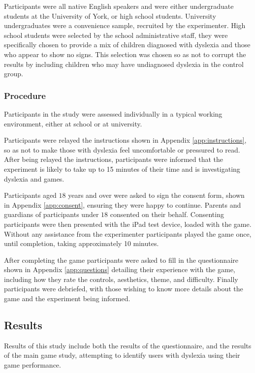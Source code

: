 \documentclass[journal]{IEEEtran}
\begin{document}
Participants were all native English speakers and were either undergraduate students at the University of York, or high school students. University undergraduates were a convenience sample, recruited by the experimenter.
High school students were selected by the school administrative staff, they were specifically chosen to provide a mix of children diagnosed with dyslexia and those who appear to show no signs. This selection was chosen so as not to corrupt the results by including children who may have undiagnosed dyslexia in the control group.

\subsubsection{Procedure}
Participants in the study were assessed individually in a typical working environment, either at school or at university. 

Participants were relayed the instructions shown in Appendix \ref{app:instructions}, so as not to make those with dyslexia feel uncomfortable or pressured to read. 
After being relayed the instructions, participants were informed that the experiment is likely to take up to 15 minutes of their time and is investigating dyslexia and games. 

Participants aged $18$ years and over were asked to sign the consent form, shown in Appendix \ref{app:consent}, ensuring they were happy to continue. Parents and guardians of participants under $18$ consented on their behalf. 
Consenting participants were then presented with the iPad test device, loaded with the game. Without any assistance from the experimenter participants played the game once, until completion, taking approximately 10 minutes. 

After completing the game participants were asked to fill in the questionnaire shown in Appendix \ref{app:questions} detailing their experience with the game, including how they rate the controls, aesthetics, theme, and difficulty.
Finally participants were debriefed, with those wishing to know more details about the game and the experiment being informed.

\subsection{Results}
Results of this study include both the results of the questionnaire, and the results of the main game study, attempting to identify users with dyslexia using their game performance.
\end{document}
